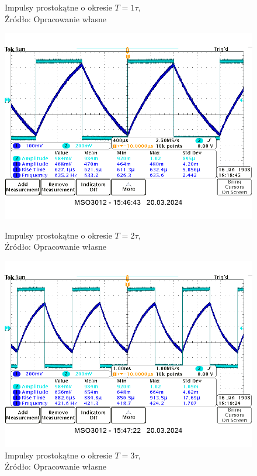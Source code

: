 \documentclass{article}
\begin{document}
\begin{figure}[!ht]
\begin{minipage}{.4\textwidth}
        \caption{Impulsy prostokątne o okresie $T = 1 \tau$,
        \\Źródło: Opracowanie własne}
      \end{minipage}
    \end{figure}

    \begin{figure}[!ht]
      \centering
      \begin{minipage}{.4\textwidth}
        \centering
        \includegraphics[scale=0.3]{grafiki/2t.png}
        \caption{Impulsy prostokątne o okresie $T = 2 \tau$,
          \\Źródło: Opracowanie własne}
      \end{minipage}
      \begin{minipage}{.4\textwidth}
        \centering
        \includegraphics[scale=0.3]{grafiki/3t.png}
        \caption{Impulsy prostokątne o okresie $T = 3 \tau$,
        \\Źródło: Opracowanie własne}
      \end{minipage}
    \end{figure}
\end{document}
